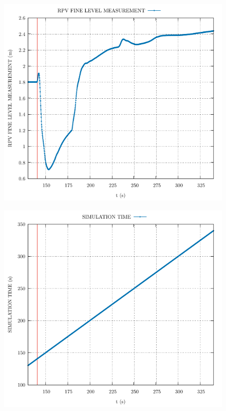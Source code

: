 \documentclass{article}
\begin{document}
\begin{multicols}{2}
\begin{figure}[H]
\end{figure}
\begin{figure}[H]
\centering
\includegraphics[width=\linewidth]{./graphs/RPV FINE LEVEL MEASUREMENT_comp.pdf}
\end{figure}
\begin{figure}[H]
\centering
\includegraphics[width=\linewidth]{./graphs/SIMULATION TIME_comp.pdf}

\end{figure}
\end{multicols}
\end{document}

